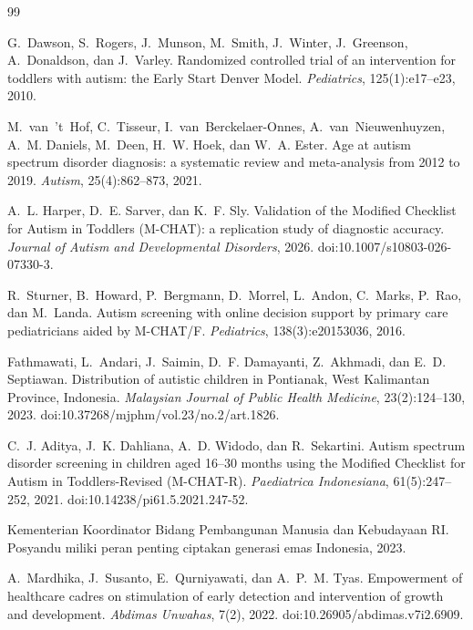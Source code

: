 \documentclass[10pt,letterpaper]{article}
\begin{document}
\newpage
\small

\begin{thebibliography}{99}

G.~Dawson, S.~Rogers, J.~Munson, M.~Smith, J.~Winter, J.~Greenson, A.~Donaldson, dan
J.~Varley. Randomized controlled trial of an intervention for toddlers with autism: the
Early Start Denver Model. \textit{Pediatrics}, 125(1):e17--e23, 2010.

M.~van~'t~Hof, C.~Tisseur, I.~van~Berckelaer-Onnes, A.~van~Nieuwenhuyzen, A.~M. Daniels,
M.~Deen, H.~W. Hoek, dan W.~A. Ester. Age at autism spectrum disorder diagnosis: a
systematic review and meta-analysis from 2012 to 2019. \textit{Autism}, 25(4):862--873,
2021.

A.~L. Harper, D.~E. Sarver, dan K.~F. Sly. Validation of the Modified Checklist for
Autism in Toddlers (M-CHAT): a replication study of diagnostic accuracy.
\textit{Journal of Autism and Developmental Disorders}, 2026.
doi:10.1007/s10803-026-07330-3.

R.~Sturner, B.~Howard, P.~Bergmann, D.~Morrel, L.~Andon, C.~Marks, P.~Rao, dan
M.~Landa. Autism screening with online decision support by primary care pediatricians
aided by M-CHAT/F. \textit{Pediatrics}, 138(3):e20153036, 2016.

Fathmawati, L.~Andari, J.~Saimin, D.~F. Damayanti, Z.~Akhmadi, dan E.~D. Septiawan.
Distribution of autistic children in Pontianak, West Kalimantan Province, Indonesia.
\textit{Malaysian Journal of Public Health Medicine}, 23(2):124--130, 2023.
doi:10.37268/mjphm/vol.23/no.2/art.1826.

C.~J. Aditya, J.~K. Dahliana, A.~D. Widodo, dan R.~Sekartini. Autism spectrum disorder
screening in children aged 16--30 months using the Modified Checklist for Autism in
Toddlers-Revised (M-CHAT-R). \textit{Paediatrica Indonesiana}, 61(5):247--252, 2021.
doi:10.14238/pi61.5.2021.247-52.

Kementerian Koordinator Bidang Pembangunan Manusia dan Kebudayaan RI. Posyandu miliki
peran penting ciptakan generasi emas Indonesia, 2023.

A.~Mardhika, J.~Susanto, E.~Qurniyawati, dan A.~P.~M. Tyas. Empowerment of healthcare
cadres on stimulation of early detection and intervention of growth and development.
\textit{Abdimas Unwahas}, 7(2), 2022. doi:10.26905/abdimas.v7i2.6909.


\end{thebibliography}
\end{document}
